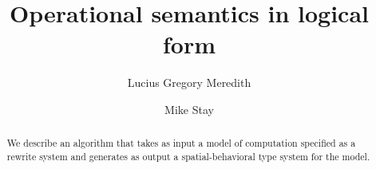 \def\lastname{Meredith}

\title{Operational semantics in logical form}

\author{ Lucius Gregory Meredith \\
         \and 
         Mike Stay
}
 

\maketitle              %


\begin{abstract}

  We describe an algorithm that takes as input a model of computation
  specified as a rewrite system and generates as output a
  spatial-behavioral type system for the model.

\end{abstract}



